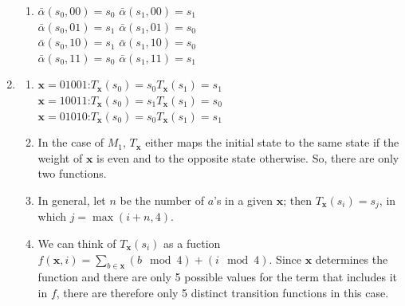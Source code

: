 \begin{enumerate}
\begin{enumerate}[label=(\alph*)]
        \item 
        $\bar{\alpha}(s_0, 00) = s_0$\quad
        $\bar{\alpha}(s_1, 00) = s_1$\\
        $\bar{\alpha}(s_0, 01) = s_1$\quad
        $\bar{\alpha}(s_1, 01) = s_0$\\
        $\bar{\alpha}(s_0, 10) = s_1$\quad
        $\bar{\alpha}(s_1, 10) = s_0$\\
        $\bar{\alpha}(s_0, 11) = s_0$\quad
        $\bar{\alpha}(s_1, 11) = s_1$
    \end{enumerate}

    \item
        \begin{enumerate}[label=(\alph*)]
            \item 
            $\mathbf{x} = 01001$:\quad $T_\mathbf{x}(s_0) = s_0$\quad $T_\mathbf{x}(s_1) = s_1$\\
            $\mathbf{x} = 10011$:\quad $T_\mathbf{x}(s_0) = s_1$\quad $T_\mathbf{x}(s_1) = s_0$\\
            $\mathbf{x} = 01010$:\quad $T_\mathbf{x}(s_0) = s_0$\quad $T_\mathbf{x}(s_1) = s_1$

            \item In the case of $M_1$, $T_\mathbf{x}$ either maps the initial state to the same state if the weight of $\mathbf{x}$ is even and to the opposite state otherwise. So, there are only two functions.

            \item In general, let $n$ be the number of $a$'s in a given $\mathbf{x}$; then $T_\mathbf{x}(s_i) = s_j$, in which $j = \max(i + n, 4)$.

            \item We can think of $T_\mathbf{x}(s_i)$ as a fuction $f(\mathbf{x}, i) = \sum\limits_{b \in \mathbf{x}} (b \mod 4) + (i \mod 4)$. Since $\mathbf{x}$ determines the function and there are only 5 possible values for the term that includes it in $f$, there are therefore only 5 distinct transition functions in this case.
        \end{enumerate}
\end{enumerate}


